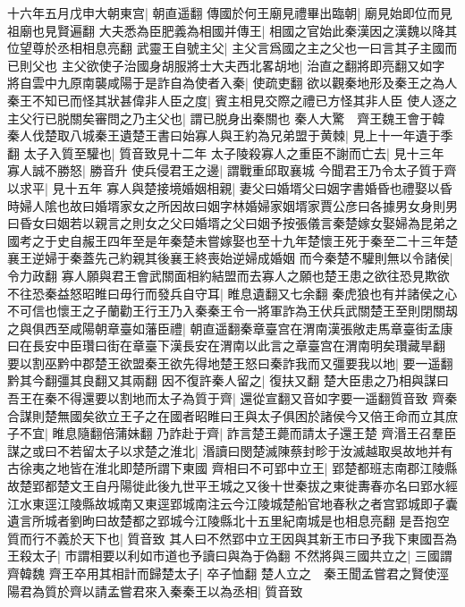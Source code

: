十六年五月戊申大朝東宫|{
	朝直遥翻}
傳國於何王廟見禮畢出臨朝|{
	廟見始即位而見祖廟也見賢遍翻}
大夫悉為臣肥義為相國并傳王|{
	相國之官始此秦漢因之漢魏以降其位望尊於丞相相息亮翻}
武靈王自號主父|{
	主父言爲國之主之父也一曰言其子主國而已則父也}
主父欲使子治國身胡服將士大夫西北畧胡地|{
	治直之翻將即亮翻又如字}
將自雲中九原南襲咸陽于是詐自為使者入秦|{
	使疏吏翻}
欲以觀秦地形及秦王之為人秦王不知已而怪其狀甚偉非人臣之度|{
	賓主相見交際之禮已方怪其非人臣}
使人逐之主父行已脱關矣審問之乃主父也|{
	謂已脱身出秦關也}
秦人大驚　齊王魏王會于韓　秦人伐楚取八城秦王遺楚王書曰始寡人與王約為兄弟盟于黄棘|{
	見上十一年遺于季翻}
太子入質至驩也|{
	質音致見十二年}
太子陵殺寡人之重臣不謝而亡去|{
	見十三年}
寡人誠不勝怒|{
	勝音升}
使兵侵君王之邊|{
	謂戰重邱取襄城}
今聞君王乃令太子質于齊以求平|{
	見十五年}
寡人與楚接境婚姻相親|{
	妻父曰婚壻父曰姻字書婚昏也禮娶以昏時婦人隂也故曰婚壻家女之所因故曰姻字林婚婦家姻壻家賈公彦曰各據男女身則男曰昏女曰姻若以親言之則女之父曰婚壻之父曰姻予按張儀言秦楚嫁女娶婦為昆弟之國考之于史自赧王四年至是年秦楚未嘗嫁娶也至十九年楚懷王死于秦至二十三年楚襄王逆婦于秦蓋先己約親其後襄王終喪始逆婦成婚姻}
而今秦楚不驩則無以令諸侯|{
	令力政翻}
寡人願與君王會武關面相約結盟而去寡人之願也楚王患之欲往恐見欺欲不往恐秦益怒昭睢曰毋行而發兵自守耳|{
	睢息遺翻又七余翻}
秦虎狼也有并諸侯之心不可信也懷王之子蘭勸王行王乃入秦秦王令一將軍詐為王伏兵武關楚王至則閉關刼之與俱西至咸陽朝章臺如藩臣禮|{
	朝直遥翻秦章臺宫在渭南漢張敞走馬章臺街孟康曰在長安中臣瓚曰街在章臺下漢長安在渭南以此言之章臺宫在渭南明矣瓚藏旱翻}
要以割巫黔中郡楚王欲盟秦王欲先得地楚王怒曰秦詐我而又彊要我以地|{
	要一遥翻黔其今翻彊其良翻又其兩翻}
因不復許秦人留之|{
	復扶又翻}
楚大臣患之乃相與謀曰吾王在秦不得還要以割地而太子為質于齊|{
	還從宣翻又音如字要一遥翻質音致}
齊秦合謀則楚無國矣欲立王子之在國者昭睢曰王與太子俱困於諸侯今又倍王命而立其庶子不宜|{
	睢息隨翻倍蒲妹翻}
乃詐赴于齊|{
	詐言楚王薨而請太子還王楚}
齊湣王召羣臣謀之或曰不若留太子以求楚之淮北|{
	湣讀曰閔楚滅陳蔡封畛于汝滅越取吳故地并有古徐夷之地皆在淮北即楚所謂下東國}
齊相曰不可郢中立王|{
	郢楚都班志南郡江陵縣故楚郢都楚文王自丹陽徙此後九世平王城之又後十世秦拔之東徙夀春亦名曰郢水經江水東逕江陵縣故城南又東逕郢城南注云今江陵城楚船官地春秋之者宫郢城即子囊遺言所城者劉昫曰故楚都之郢城今江陵縣北十五里紀南城是也相息亮翻}
是吾抱空質而行不義於天下也|{
	質音致}
其人曰不然郢中立王因與其新王市曰予我下東國吾為王殺太子|{
	市謂相要以利如市道也予讀曰與為于偽翻}
不然將與三國共立之|{
	三國謂齊韓魏}
齊王卒用其相計而歸楚太子|{
	卒子恤翻}
楚人立之　秦王聞孟嘗君之賢使涇陽君為質於齊以請孟嘗君來入秦秦王以為丞相|{
	質音致}


